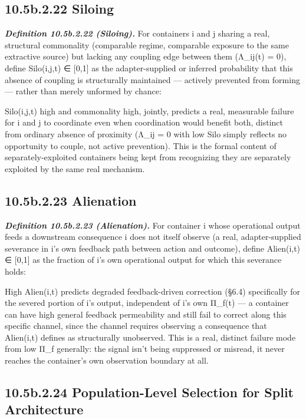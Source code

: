 \documentclass[
]{article}
\begin{document}
\hypertarget{b.2.22-siloing}{%
\subsection{10.5b.2.22 Siloing}\label{b.2.22-siloing}}

\emph{\textbf{Definition 10.5b.2.22 (Siloing).}} For containers i and j
sharing a real, structural commonality (comparable regime, comparable
exposure to the same extractive source) but lacking any coupling edge
between them (Λ\_ij(t) = 0), define Silo(i,j,t) ∈ {[}0,1{]} as the
adapter-supplied or inferred probability that this absence of coupling
is structurally maintained --- actively prevented from forming ---
rather than merely unformed by chance:

Silo(i,j,t) high and commonality high, jointly, predicts a real,
measurable failure for i and j to coordinate even when coordination
would benefit both, distinct from ordinary absence of proximity (Λ\_ij =
0 with low Silo simply reflects no opportunity to couple, not active
prevention). This is the formal content of separately-exploited
containers being kept from recognizing they are separately exploited by
the same real mechanism.

\hypertarget{b.2.23-alienation}{%
\subsection{10.5b.2.23 Alienation}\label{b.2.23-alienation}}

\emph{\textbf{Definition 10.5b.2.23 (Alienation).}} For container i
whose operational output feeds a downstream consequence i does not
itself observe (a real, adapter-supplied severance in i's own feedback
path between action and outcome), define Alien(i,t) ∈ {[}0,1{]} as the
fraction of i's own operational output for which this severance holds:

High Alien(i,t) predicts degraded feedback-driven correction (§6.4)
specifically for the severed portion of i's output, independent of i's
own Π\_f(t) --- a container can have high general feedback permeability
and still fail to correct along this specific channel, since the channel
requires observing a consequence that Alien(i,t) defines as structurally
unobserved. This is a real, distinct failure mode from low Π\_f
generally: the signal isn't being suppressed or misread, it never
reaches the container's own observation boundary at all.

\hypertarget{b.2.24-population-level-selection-for-split-architecture}{%
\subsection{10.5b.2.24 Population-Level Selection for Split
Architecture}\label{b.2.24-population-level-selection-for-split-architecture}}
\end{document}
